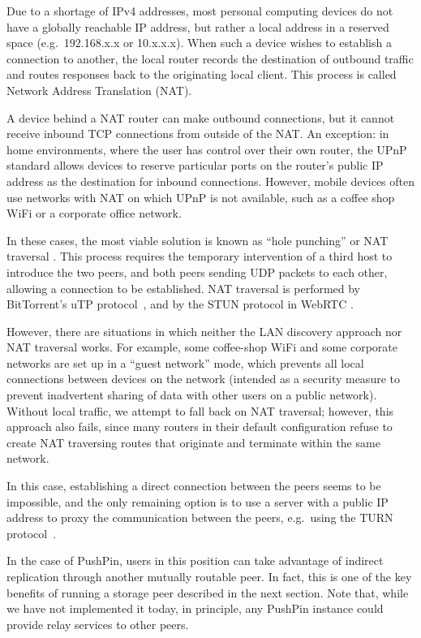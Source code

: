 \documentclass[sigplan,10pt]{acmart}
\begin{document}
Due to a shortage of IPv4 addresses, most personal computing devices do not have a globally reachable IP address, but rather a local address in a reserved space (e.g.\ 192.168.x.x or 10.x.x.x).
When such a device wishes to establish a connection to another, the local router records the destination of outbound traffic and routes responses back to the originating local client.
This process is called Network Address Translation (NAT).

A device behind a NAT router can make outbound connections, but it cannot receive inbound TCP connections from outside of the NAT.
An exception: in home environments, where the user has control over their own router, the UPnP standard allows devices to reserve particular ports on the router's public IP address as the destination for inbound connections.
However, mobile devices often use networks with NAT on which UPnP is not available, such as a coffee shop WiFi or a corporate office network.

In these cases, the most viable solution is known as ``hole punching'' or NAT traversal \cite{RFC5389}.
This process requires the temporary intervention of a third host to introduce the two peers, and both peers sending UDP packets to each other, allowing a connection to be established.
NAT traversal is performed by BitTorrent's uTP protocol~\cite{BEP29}, and by the STUN protocol in WebRTC \cite{RFC5389}.

However, there are situations in which neither the LAN discovery approach nor NAT traversal works.
For example, some coffee-shop WiFi and some corporate networks are set up in a ``guest network'' mode, which prevents all local connections between devices on the network (intended as a security measure to prevent inadvertent sharing of data with other users on a public network).
Without local traffic, we attempt to fall back on NAT traversal; however, this approach also fails, since many routers in their default configuration refuse to create NAT traversing routes that originate and terminate within the same network.

In this case, establishing a direct connection between the peers seems to be impossible, and the only remaining option is to use a server with a public IP address to proxy the communication between the peers, e.g.\ using the TURN protocol~\cite{RFC5766}.

In the case of PushPin, users in this position can take advantage of indirect replication through another mutually routable peer. In fact, this is one of the key benefits of running a storage peer described in the next section. Note that, while we have not implemented it today, in principle, any PushPin instance could provide relay services to other peers. 
\end{document}
